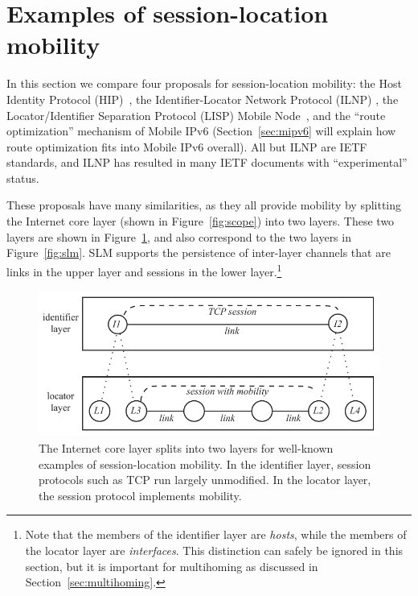\section{Examples of session-location mobility}
\label{sec:sec6}

In this section we compare four proposals for session-location
mobility: the
Host Identity Protocol (HIP)~\cite{RFC-4423,HIP}, 
the Identifier-Locator Network Protocol (ILNP) \cite{ILNP1,ILNP2},
the
Locator/Identifier Separation Protocol (LISP) Mobile Node~\cite{LISP-MN}, 
and the ``route optimization'' mechanism of Mobile 
IPv6 \cite{mipv6old,mipv6new}
(Section~\ref{sec:mipv6} will explain how route optimization fits into
Mobile IPv6 overall).
All but ILNP are IETF standards, and ILNP has resulted in many
IETF documents with ``experimental'' status.

These proposals have many similarities, as
they all provide mobility by splitting 
the Internet core layer (shown in Figure~\ref{fig:scope}) into two
layers.
These two layers 
are shown in Figure~\ref{fig:identloc}, and also correspond to
the two layers in Figure~\ref{fig:slm}.
SLM supports the persistence of inter-layer channels that are
links in the upper layer and sessions in the lower
layer.\footnote{Note that the members of the
identifier layer are {\it hosts}, while the members of the locator
layer are {\it interfaces}.
This distinction can safely be ignored in this section, but it is
important for multihoming as discussed in Section~\ref{sec:multihoming}.}

\begin{figure}
\centering
\includegraphics[scale=0.80]{figures/identloc.pdf}
\caption{The Internet core layer splits into two layers for
well-known examples of session-location mobility.  
In the identifier layer, session protocols such as TCP run
largely unmodified.
In the locator layer, the session protocol implements mobility.}
\label{fig:identloc}
\end{figure}


